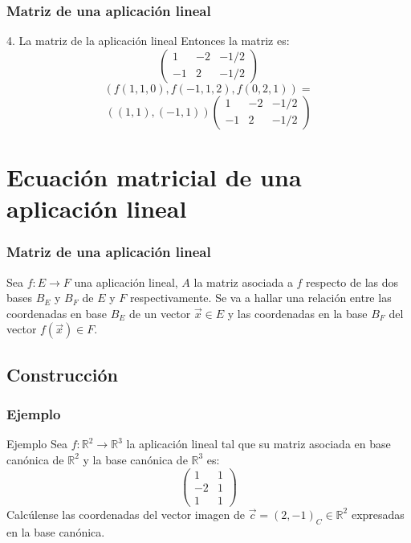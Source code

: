 \documentclass{beamer}
\begin{document}
      \begin{frame}
  \frametitle{Matriz de una aplicaci\'on lineal}
\begin{block}{4. La matriz de la aplicaci\'on lineal}
Entonces la matriz es:
\[\left(\begin{array}{ccc}1 & -2 & -1/2 \\-1 & 2 & -1/2\end{array}\right)\]
\[(f(1,1,0), f(-1,1,2),f(0,2,1)) =\]
\[ ((1,1),(-1,1))\left(\begin{array}{ccc}1 & -2 & -1/2 \\-1 & 2 & -1/2\end{array}\right)\]

\end{block}
  \end{frame}    

\section{Ecuaci\'on matricial de una aplicaci\'on lineal}
\begin{frame}
  \frametitle{Matriz de una aplicaci\'on lineal}
Sea $f:E\longrightarrow F$ una aplicaci\'on lineal, $A$ la matriz asociada a $f$ respecto de las dos bases $B_E$ y $B_F$ de $E$ y $F$ respectivamente. Se va a hallar una relaci\'on entre las coordenadas en base $B_E$ de un vector $\vec x \in E$ y las coordenadas en la base $B_F$ del vector $f(\vec x ) \in F$. 

  \end{frame} 
  
\subsection{Construcci\'on}
 \begin{frame}
  \frametitle{Ejemplo}
\begin{block}{Ejemplo}
Sea $f:\mathbb R^2 \longrightarrow \mathbb R^3$ la aplicaci\'on lineal tal que su matriz asociada en base can\'onica de $\mathbb R^2$ y la base can\'onica de $\mathbb R^3$ es:
\[\left(\begin{array}{cc}1 & 1 \\-2 & 1 \\1 & 1\end{array}\right)\]
Calc\'ulense las coordenadas del vector imagen de $\vec c = (2,-1)_C\in \mathbb R^2$ expresadas en la base can\'onica. 
\end{block}
  \end{frame}    
  
\end{document}
